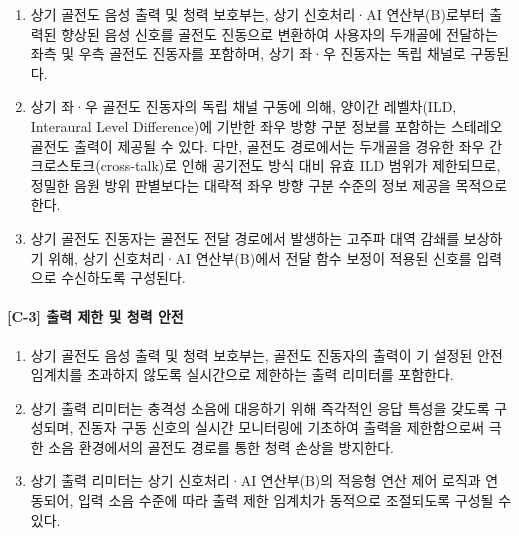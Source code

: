 \documentclass{article}
\begin{document}
\begin{enumerate}[label = \textbf{(C.2.\arabic*)}]

    \item 상기 골전도 음성 출력 및 청력 보호부는, 상기 신호처리·AI 연산부(B)로부터 출력된 향상된 음성 신호를 골전도 진동으로 변환하여 사용자의 두개골에 전달하는 좌측 및 우측 골전도 진동자를 포함하며, 상기 좌·우 진동자는 독립 채널로 구동된다.

    \item 상기 좌·우 골전도 진동자의 독립 채널 구동에 의해, 양이간 레벨차(ILD, Interaural Level Difference)에 기반한 좌우 방향 구분 정보를 포함하는 스테레오 골전도 출력이 제공될 수 있다. 다만, 골전도 경로에서는 두개골을 경유한 좌우 간 크로스토크(cross-talk)로 인해 공기전도 방식 대비 유효 ILD 범위가 제한되므로, 정밀한 음원 방위 판별보다는 대략적 좌우 방향 구분 수준의 정보 제공을 목적으로 한다.

    \item 상기 골전도 진동자는 골전도 전달 경로에서 발생하는 고주파 대역 감쇄를 보상하기 위해, 상기 신호처리·AI 연산부(B)에서 전달 함수 보정이 적용된 신호를 입력으로
    수신하도록 구성된다.

\end{enumerate}


\paragraph{[C-3] 출력 제한 및 청력 안전}

\begin{enumerate}[label = \textbf{(C.3.\arabic*)}]

    \item 상기 골전도 음성 출력 및 청력 보호부는, 골전도
    진동자의 출력이 기 설정된 안전 임계치를 초과하지 않도록
    실시간으로 제한하는 출력 리미터를 포함한다.

    \item 상기 출력 리미터는 충격성 소음에 대응하기 위해
    즉각적인 응답 특성을 갖도록 구성되며, 진동자 구동 신호의
    실시간 모니터링에 기초하여 출력을 제한함으로써 극한
    소음 환경에서의 골전도 경로를 통한 청력 손상을 방지한다.

    \item 상기 출력 리미터는 상기 신호처리·AI 연산부(B)의
    적응형 연산 제어 로직과 연동되어, 입력 소음 수준에 따라
    출력 제한 임계치가 동적으로 조절되도록 구성될 수 있다.

\end{enumerate}
\end{document}
